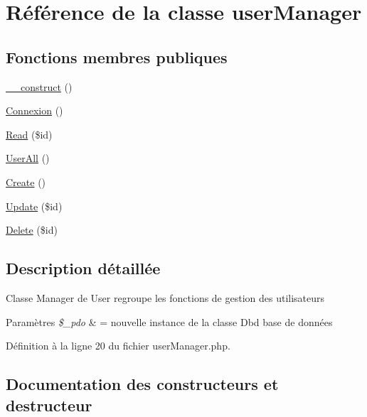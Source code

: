 \hypertarget{class_src_1_1_managers_1_1user_manager}{}\section{Référence de la classe user\+Manager}
\label{class_src_1_1_managers_1_1user_manager}
\subsection*{Fonctions membres publiques}
\begin{DoxyCompactItemize}
\item 
\hyperlink{class_src_1_1_managers_1_1user_manager_a095c5d389db211932136b53f25f39685}{\+\_\+\+\_\+construct} ()
\item 
\hyperlink{class_src_1_1_managers_1_1user_manager_a00fdd5c0ca353b468ea33fb246c28d90}{Connexion} ()
\item 
\hyperlink{class_src_1_1_managers_1_1user_manager_ad2bbc9b3130abdfe3a9fc9e9fe36716f}{Read} (\$id)
\item 
\hyperlink{class_src_1_1_managers_1_1user_manager_a0a377befd1052a5f989fd915af31373b}{User\+All} ()
\item 
\hyperlink{class_src_1_1_managers_1_1user_manager_ad01f71fa0ecc039494e3c282864298c3}{Create} ()
\item 
\hyperlink{class_src_1_1_managers_1_1user_manager_a82232b33fbfacdbdb8a8f49acaecf564}{Update} (\$id)
\item 
\hyperlink{class_src_1_1_managers_1_1user_manager_a59113b5ecd1d155db6a4f30af34a1e80}{Delete} (\$id)
\end{DoxyCompactItemize}


\subsection{Description détaillée}
Classe Manager de User regroupe les fonctions de gestion des utilisateurs 
\begin{DoxyParams}{Paramètres}
{\em \$\+\_\+pdo} & = nouvelle instance de la classe Dbd base de données \\
\hline
\end{DoxyParams}


Définition à la ligne 20 du fichier user\+Manager.\+php.



\subsection{Documentation des constructeurs et destructeur}
\mbox{\label{class_src_1_1_managers_1_1user_manager_a095c5d389db211932136b53f25f39685}} 
